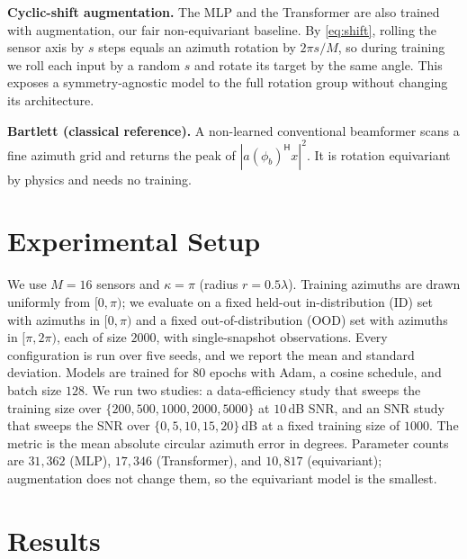 \documentclass[conference]{IEEEtran}
\begin{document}
\textbf{Cyclic-shift augmentation.} The MLP and the Transformer are also trained
with augmentation, our fair non-equivariant baseline. By \eqref{eq:shift}, rolling
the sensor axis by $s$ steps equals an azimuth rotation by $2\pi s/M$, so during
training we roll each input by a random $s$ and rotate its target by the same
angle. This exposes a symmetry-agnostic model to the full rotation group without
changing its architecture.

\textbf{Bartlett (classical reference).} A non-learned conventional beamformer
scans a fine azimuth grid and returns the peak of $|a(\phi_b)^{\mathsf H}x|^2$. It
is rotation equivariant by physics and needs no training.

\section{Experimental Setup}
We use $M=16$ sensors and $\kappa=\pi$ (radius $r=0.5\lambda$). Training azimuths
are drawn uniformly from $[0,\pi)$; we evaluate on a fixed held-out
in-distribution (ID) set with azimuths in $[0,\pi)$ and a fixed out-of-distribution
(OOD) set with azimuths in $[\pi,2\pi)$, each of size $2000$, with single-snapshot
observations. Every configuration is run over five seeds, and we report the mean
and standard deviation. Models are trained for $80$ epochs with Adam, a cosine
schedule, and batch size $128$. We run two studies: a data-efficiency study that
sweeps the training size over $\{200,500,1000,2000,5000\}$ at $10$\,dB SNR, and an
SNR study that sweeps the SNR over $\{0,5,10,15,20\}$\,dB at a fixed training size
of $1000$. The metric is the mean absolute circular azimuth error in degrees.
Parameter counts are $31{,}362$ (MLP), $17{,}346$ (Transformer), and $10{,}817$
(equivariant); augmentation does not change them, so the equivariant model is the
smallest.

\section{Results}
\end{document}
